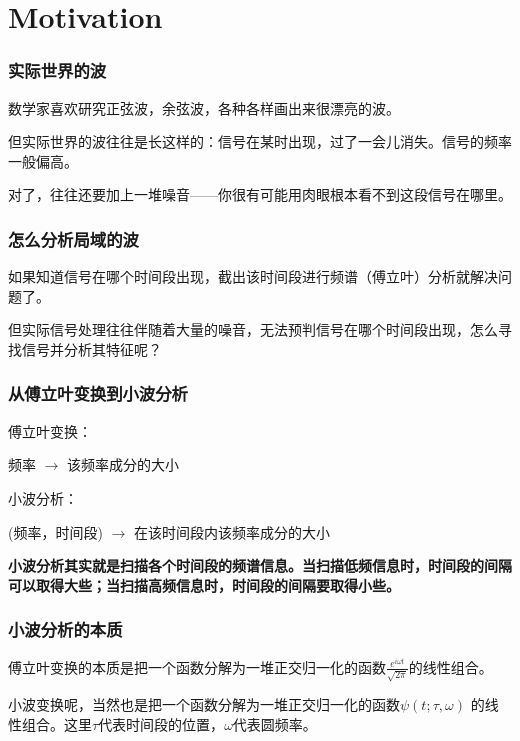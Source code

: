 \documentclass[CJK]{beamer}
\date{}
\begin{document}
  \bch
{}

\begin{frame}
  \tableofcontents
\end{frame}

\section{Motivation}


\begin{frame}
  \frametitle{实际世界的波}
  
  数学家喜欢研究正弦波，余弦波，各种各样画出来很漂亮的波。

  \skipline
  
  但实际世界的波往往是长这样的：信号在某时出现，过了一会儿消失。信号的频率一般偏高。
  

  对了，往往还要加上一堆噪音——你很有可能用肉眼根本看不到这段信号在哪里。
  
\end{frame}


\begin{frame}
  \frametitle{怎么分析局域的波}
  
  如果知道信号在哪个时间段出现，截出该时间段进行频谱（傅立叶）分析就解决问题了。

  
  但实际信号处理往往伴随着大量的噪音，无法预判信号在哪个时间段出现，怎么寻找信号并分析其特征呢？

\end{frame}


\begin{frame}
  \frametitle{从傅立叶变换到小波分析}

  傅立叶变换：
  
  频率 $\rightarrow$ 该频率成分的大小

  \skiplines


  小波分析：
  
  (频率，时间段) $\rightarrow $ 在该时间段内该频率成分的大小

  \skiplines
  

{\bf  小波分析其实就是扫描各个时间段的频谱信息。当扫描低频信息时，时间段的间隔可以取得大些；当扫描高频信息时，时间段的间隔要取得小些。 } 
\end{frame}


\begin{frame}
  \frametitle{小波分析的本质}
  傅立叶变换的本质是把一个函数分解为一堆正交归一化的函数$\frac{e^{i\omega t}}{\sqrt{2\pi}}$的线性组合。

  \skiplines
  
  小波变换呢，当然也是把一个函数分解为一堆正交归一化的函数$\psi(t; \tau, \omega)$ 的线性组合。这里$\tau$代表时间段的位置，$\omega$代表圆频率。
\end{frame}
\end{document}
